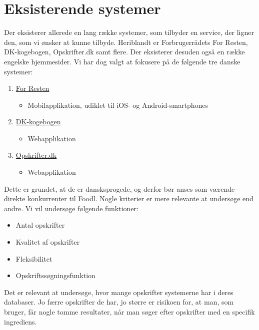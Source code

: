 \section{Eksisterende systemer}
\label{sec:eksisterendesystemer}

Der eksisterer allerede en lang række systemer, som tilbyder en service, der ligner den, som vi ønsker at kunne tilbyde. Heriblandt er Forbrugerrådets For Resten, DK-kogebogen, Opskrifter.dk samt flere. Der eksisterer desuden også en række engelske hjemmesider. Vi har dog valgt at fokusere på de følgende tre danske systemer: 

\begin{enumerate}[noitemsep]
  \item \href{https://play.google.com/store/apps/details?id=com.nodes.forresten}{For Resten} \cite{forresten}
  \begin{itemize}[noitemsep]
  \item Mobilapplikation, udiklet til iOS- og Android-smartphones
  \end{itemize}
  \item \href{http://www.dk-kogebogen.dk/}{DK-kogebogen} \cite{dkkogebogen}
  \begin{itemize}[noitemsep]
  \item Webapplikation
  \end{itemize}
  \item \href{http://opskrifter.dk/}{Opskrifter.dk} \cite{opskrifterdk}
  \begin{itemize}[noitemsep]
  \item Webapplikation
  \end{itemize}
\end{enumerate}

Dette er grundet, at de er dansksprogede, og derfor bør anses som værende direkte konkurrenter til Foodl. Nogle kriterier er mere relevante at undersøge end andre. Vi vil undersøge følgende funktioner:

\begin{itemize}[noitemsep]
  \item Antal opskrifter
  \item Kvalitet af opskrifter
  \item Fleksibilitet
  \item Opskriftssøgningsfunktion
\end{itemize}

Det er relevant at undersøge, hvor mange opskrifter systemerne har i deres databaser. Jo færre opskrifter de har, jo større er risikoen for, at man, som bruger, får nogle tomme resultater, når man søger efter opskrifter med en specifik ingrediens. 

